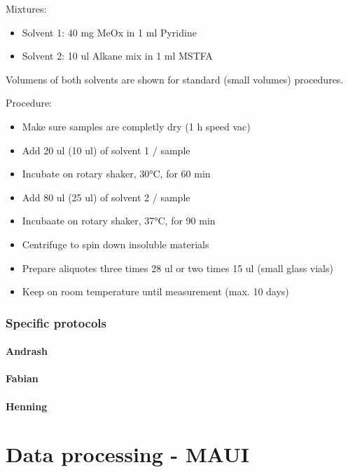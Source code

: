 \documentclass[]{book}
\providecommand{\tightlist}{%
  \setlength{\itemsep}{0pt}\setlength{\parskip}{0pt}}
\theoremstyle{definition}
\theoremstyle{definition}
\theoremstyle{definition}
\theoremstyle{remark}
\begin{document}
Mixtures:

\begin{itemize}
\tightlist
\item
  Solvent 1: 40 mg MeOx in 1 ml Pyridine
\item
  Solvent 2: 10 ul Alkane mix in 1 ml MSTFA
\end{itemize}

Volumens of both solvents are shown for standard (small volumes)
procedures.

Procedure:

\begin{itemize}
\tightlist
\item
  Make sure samples are completly dry (1 h speed vac)
\item
  Add 20 ul (10 ul) of solvent 1 / sample
\item
  Incubate on rotary shaker, 30°C, for 60 min
\item
  Add 80 ul (25 ul) of solvent 2 / sample
\item
  Incubaate on rotary shaker, 37°C, for 90 min
\item
  Centrifuge to spin down insoluble materials
\item
  Prepare aliquotes three times 28 ul or two times 15 ul (small glass
  vials)
\item
  Keep on room temperature until measurement (max. 10 days)
\end{itemize}

\subsection{Specific protocols}\label{specific-protocols}

\subsubsection{Andrash}\label{andrash}

\subsubsection{Fabian}\label{fabian}

\subsubsection{Henning}\label{henning}

\chapter{Data processing - MAUI}\label{proc:maui}
\end{document}

